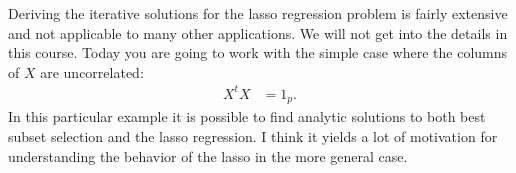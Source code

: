 \documentclass[12pt,hidelinks]{article}
\numberwithin{equation}{section}
\begin{document}
Deriving the iterative solutions for the lasso regression problem is fairly
extensive and not applicable to many other applications. We will not get into
the details in this course. Today you are going to work with the simple case
where the columns of $X$ are uncorrelated:
\begin{align}
X^t X &= 1_p. \label{uncor}
\end{align}
In this particular example it is possible to find analytic solutions to both
best subset selection and the lasso regression. I think it yields a lot of
motivation for understanding the behavior of the lasso in the more general
case.
\end{document}

